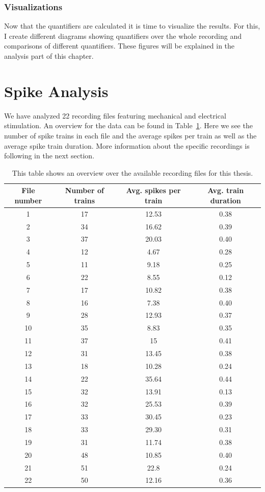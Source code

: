 \subsubsection{Visualizations}
Now that the quantifiers are calculated it is time to visualize the results. For this, I create different diagrams showing quantifiers over the whole recording and comparisons of different quantifiers. These figures will be explained in the analysis part of this chapter.\\



\section{Spike Analysis}
We have analyzed 22 recording files featuring  mechanical and electrical stimulation. An overview for the data can be found in  Table~\ref{table:recording_overview}. Here we see the number of spike trains in each file and the average spikes per train as well as the average spike train duration. More information about the specific recordings is following in the next section.

\begin{table}[!ht]
\centering
\begin{tabular}{ |c|c|c|c| }
	\hline
	File number & Number of trains  & Avg. spikes per train & Avg. train duration\\
	\hline
	1 & 17 & 12.53 & 0.38 \\
	2 & 34 & 16.62 & 0.39 \\
	3 & 37 & 20.03 & 0.40 \\
	4 & 12 & 4.67 & 0.28 \\
	5 & 11 & 9.18 & 0.25 \\
	6 & 22 & 8.55 & 0.12 \\
	7 & 17 & 10.82 & 0.38 \\
	8 & 16 & 7.38 & 0.40 \\
	9 & 28 & 12.93 & 0.37 \\
	10 & 35 & 8.83 & 0.35 \\
	11 & 37 & 15 & 0.41 \\
	12 & 31 & 13.45 & 0.38 \\
	13 & 18 & 10.28 & 0.24 \\
	14 & 22 & 35.64 & 0.44 \\
	15 & 32 & 13.91 & 0.13 \\
	16 & 32 & 25.53 & 0.39 \\
	17 & 33 & 30.45 & 0.23 \\
	18 & 33 & 29.30 & 0.31 \\
	19 & 31 & 11.74 & 0.38 \\
	20 & 48 & 10.85 & 0.40 \\
	21 & 51 & 22.8 & 0.24 \\
	22 & 50 & 12.16 & 0.36\\
	\hline
\end{tabular}
\caption{This table shows an overview over the available recording files for this thesis.}
\label{table:recording_overview}
\end{table}

